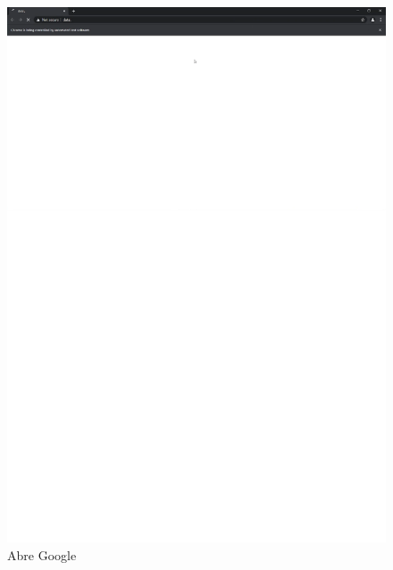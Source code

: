 \documentclass[conference]{IEEEtran}
\begin{document}
\begin{figure}[H]
\centering
\includegraphics[scale=0.47]{imagenes/4Abreelbuscador.pdf}
\caption{Abre Google}
\end{figure}
\end{document}
